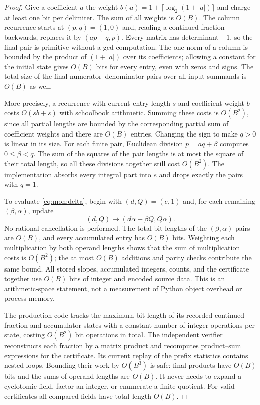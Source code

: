 \documentclass[11pt,a4paper]{article}
\theoremstyle{definition}
\theoremstyle{remark}
\numberwithin{equation}{section}
\begin{document}
\begin{proof}
Give a coefficient $a$ the weight
$b(a)=1+\lceil\log_2(1+|a|)\rceil$ and charge at least one bit per delimiter.
The sum of all weights is $O(B)$. The column recurrence starts at $(p,q)=(1,0)$
and, reading a continued fraction backwards, replaces it by
$(ap+q,p)$. Every matrix has determinant $-1$, so the final pair is primitive
without a gcd computation. The one-norm of a column is bounded by the
product of $(1+|a|)$ over its coefficients; allowing a constant for the
initial state gives $O(B)$ bits for every entry, even with zeros and signs.
The total size of the final numerator--denominator pairs over all input
summands is $O(B)$ as well.

More precisely, a recurrence with current entry length $s$ and coefficient
weight $b$ costs $O(sb+s)$ with schoolbook arithmetic. Summing these costs
is $O(B^2)$, since all partial lengths are bounded by the corresponding
partial sum of coefficient weights and there are $O(B)$ entries.
Changing the sign to make $q>0$ is linear in its size. For each finite pair,
Euclidean division $p=aq+\beta$ computes $0\le\beta<q$. The sum of the
squares of the pair lengths is at most the square of their total length,
so all these divisions together still cost $O(B^2)$. The implementation
absorbs every integral part into $e$ and drops exactly the pairs with $q=1$.

To evaluate \eqref{eq:mon:delta}, begin with $(d,Q)=(e,1)$ and, for each
remaining $(\beta,\alpha)$, update
\[
 (d,Q)\longmapsto(d\alpha+\beta Q,Q\alpha).
\]
No rational cancellation is performed. The total bit lengths of the
$(\beta,\alpha)$ pairs are $O(B)$, and every accumulated entry has
$O(B)$ bits. Weighting each multiplication by both operand lengths shows
that the sum of multiplication costs is $O(B^2)$; the at most $O(B)$
additions and parity checks contribute the same bound. All stored slopes,
accumulated integers, counts, and the certificate together use $O(B)$ bits
of integer and encoded source data. This is an arithmetic-space statement,
not a measurement of Python object overhead or process memory.

The production code tracks the maximum bit length of its recorded
continued-fraction and accumulator states with a constant number of integer
operations per state, costing $O(B^2)$ bit operations in total.
The independent verifier reconstructs each fraction by a matrix product and
recomputes product--sum expressions for the certificate. Its current replay
of the prefix statistics contains nested loops. Bounding their work by
$O(B^3)$ is safe: final products have $O(B)$ bits and the sums of operand
lengths are $O(B)$. It never needs to expand a cyclotomic field, factor an
integer, or enumerate a finite quotient. For valid certificates all compared
fields have total length $O(B)$.
\end{proof}
\end{document}
